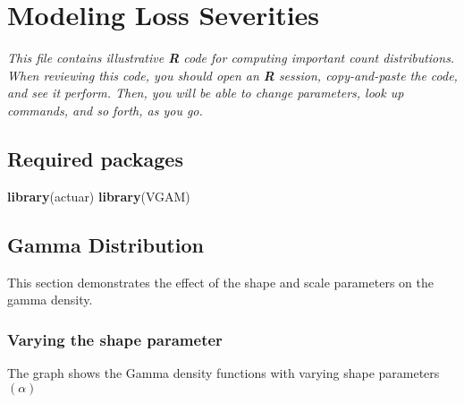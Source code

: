 \documentclass[]{book}
\newenvironment{Shaded}{\begin{snugshade}}{\end{snugshade}}
\newcommand{\KeywordTok}[1]{\textcolor[rgb]{0.13,0.29,0.53}{\textbf{#1}}}
\newcommand{\NormalTok}[1]{#1}
\theoremstyle{definition}
\theoremstyle{definition}
\theoremstyle{definition}
\theoremstyle{remark}
\begin{document}
\chapter{Modeling Loss Severities}\label{modeling-loss-severities}

\emph{This file contains illustrative \textbf{R} code for computing
important count distributions. When reviewing this code, you should open
an \textbf{R} session, copy-and-paste the code, and see it perform.
Then, you will be able to change parameters, look up commands, and so
forth, as you go. }

\section{Required packages}\label{required-packages}

\begin{Shaded}
\begin{Highlighting}[]
\KeywordTok{library}\NormalTok{(actuar)}
\KeywordTok{library}\NormalTok{(VGAM)}
\end{Highlighting}
\end{Shaded}

\section{Gamma Distribution}\label{gamma-distribution}

This section demonstrates the effect of the shape and scale parameters
on the gamma density.

\subsection{Varying the shape
parameter}\label{varying-the-shape-parameter}

The graph shows the Gamma density functions with varying shape
parameters \((\alpha)\)
\end{document}
